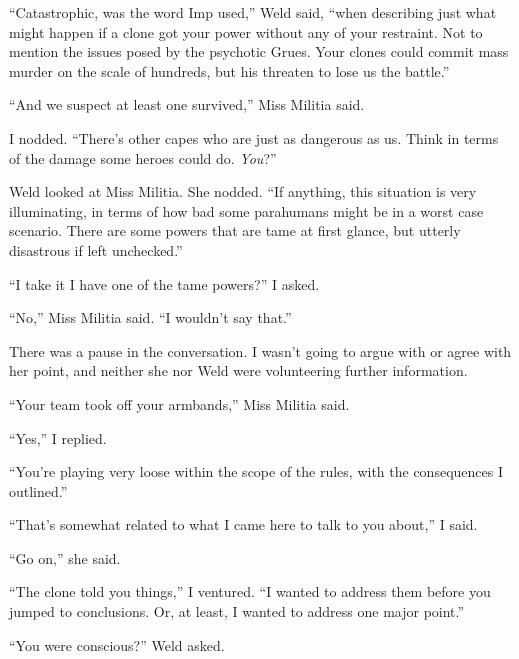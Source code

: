 ``Catastrophic, was the word Imp used,'' Weld said, ``when describing just what might happen if a clone got your power without any of your restraint.  Not to mention the issues posed by the psychotic Grues.  Your clones could commit mass murder on the scale of hundreds, but his threaten to lose us the battle.''



``And we suspect at least one survived,'' Miss Militia said.



I nodded.  ``There's other capes who are just as dangerous as us.  Think in terms of the damage some heroes could do.  \emph{You}?''



Weld looked at Miss Militia.  She nodded.  ``If anything, this situation is very illuminating, in terms of how bad some parahumans might be in a worst case scenario.  There are some powers that are tame at first glance, but utterly disastrous if left unchecked.''



``I take it I have one of the tame powers?'' I asked.



``No,'' Miss Militia said.  ``I wouldn't say that.''



There was a pause in the conversation.  I wasn't going to argue with or agree with her point, and neither she nor Weld were volunteering further information.



``Your team took off your armbands,'' Miss Militia said.



``Yes,'' I replied.



``You're playing very loose within the scope of the rules, with the consequences I outlined.''



``That's somewhat related to what I came here to talk to you about,'' I said.



``Go on,'' she said.



``The clone told you things,'' I ventured.  ``I wanted to address them before you jumped to conclusions.  Or, at least, I wanted to address one major point.''



``You were conscious?''  Weld asked.



